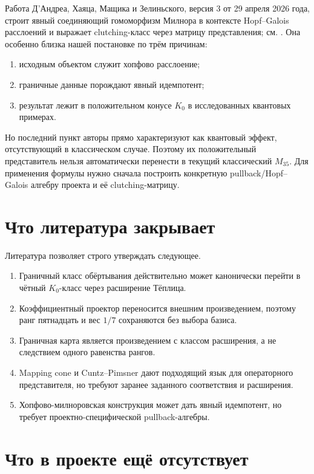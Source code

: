 Работа Д'Андреа, Хаяца, Мащика и Зелиньского, версия 3 от 29 апреля
2026 года, строит явный соединяющий гомоморфизм Милнора в контексте
Hopf--Galois расслоений и выражает clutching-класс через матрицу
представления; см. . Она особенно близка нашей
постановке по трём причинам:
\begin{enumerate}
 \item исходным объектом служит хопфово расслоение;
 \item граничные данные порождают явный идемпотент;
 \item результат лежит в положительном конусе $K_0$ в исследованных
 квантовых примерах.
\end{enumerate}

Но последний пункт авторы прямо характеризуют как квантовый эффект,
отсутствующий в классическом случае. Поэтому их положительный
представитель нельзя автоматически перенести в текущий классический
$M_{35}$. Для применения формулы нужно сначала построить конкретную
pullback/Hopf--Galois алгебру проекта и её clutching-матрицу.

\section{Что литература закрывает}

Литература позволяет строго утверждать следующее.
\begin{enumerate}
 \item Граничный класс обёртывания действительно может канонически
 перейти в чётный $K_0$-класс через расширение Тёплица.
 \item Коэффициентный проектор переносится внешним произведением, поэтому
 ранг пятнадцать и вес $1/7$ сохраняются без выбора базиса.
 \item Граничная карта является произведением с классом расширения, а не
 следствием одного равенства рангов.
 \item Mapping cone и Cuntz--Pimsner дают подходящий язык для
 операторного представителя, но требуют заранее заданного соответствия и
 расширения.
 \item Хопфово-милноровская конструкция может дать явный идемпотент, но
 требует проектно-специфической pullback-алгебры.
\end{enumerate}

\section{Что в проекте ещё отсутствует}

